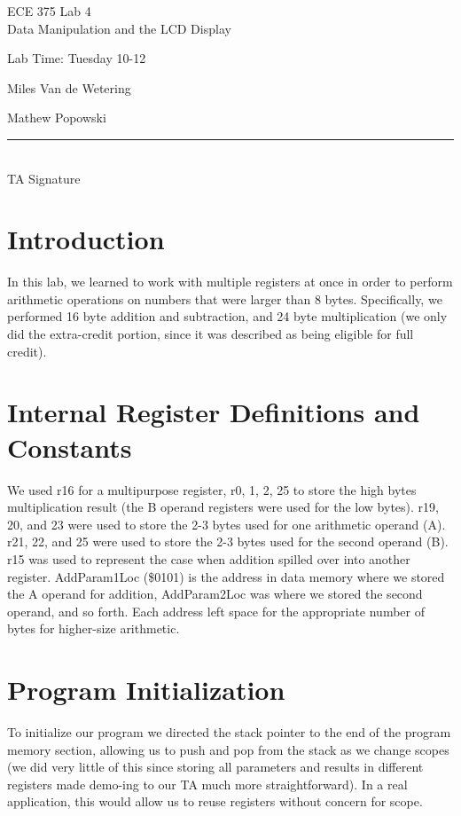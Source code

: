 \documentclass[12pt,letterpaper]{article}
\begin{document}
\begin{titlepage}
    \vspace*{4cm}
    \begin{flushright}
    {\huge
        ECE 375 Lab 4\\[1cm]
    }
    {\large
        Data Manipulation and the LCD Display
    }
    \end{flushright}
    \begin{flushleft}
    Lab Time: Tuesday 10-12
    \end{flushleft}
    \begin{flushright}
    Miles Van de Wetering

	Mathew Popowski
    \vfill
    \rule{5in}{.5mm}\\
    TA Signature
    \end{flushright}

\end{titlepage}

\section{Introduction}
In this lab, we learned to work with multiple registers at once in order to perform arithmetic operations on numbers that were larger than 8 bytes. Specifically, we performed 16 byte addition and subtraction, and 24 byte multiplication (we only did the extra-credit portion, since it was described as being eligible for full credit). 

\section{Internal Register Definitions and Constants}
We used r16 for a multipurpose register, r0, 1, 2, 25 to store the high bytes multiplication result (the B operand registers were used for the low bytes). r19, 20, and 23 were used to store the 2-3 bytes used for one arithmetic operand (A). r21, 22, and 25 were used to store the 2-3 bytes used for the second operand (B). r15 was used to represent the case when addition spilled over into another register. AddParam1Loc (\$0101) is the address in data memory where we stored the A operand for addition, AddParam2Loc was where we stored the second operand, and so forth. Each address left space for the appropriate number of bytes for higher-size arithmetic.

\section{Program Initialization}
To initialize our program we directed the stack pointer to the end of the program memory section, allowing us to push and pop from the stack as we change scopes (we did very little of this since storing all parameters and results in different registers made demo-ing to our TA much more straightforward). In a real application, this would allow us to reuse registers without concern for scope.
\end{document}
